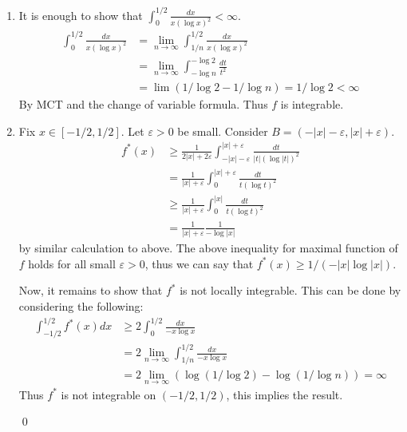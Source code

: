 \begin{problem}[3.5] \hfill

	\begin{enumerate}[label = (\alph*)]
		\item It is enough to show that $\int_0 ^{1/2} \frac{dx}{x(\log x)^2} < \infty$.
			\[
				\begin{split}
					\int_0^{1/2}\frac{dx}{x(\log x)^2}
					& = \lim_{n\rightarrow \infty} \int_{1/n}^{1/2} \frac{dx}{x (\log x )^2} \\
					& = \lim_{n\rightarrow \infty} \int_{-\log n}^{-\log 2} \frac{dt}{t^2} \\
					& = \lim \left( 1/\log 2 - 1/\log n \right) = 1/ \log 2 <\infty
				\end{split}
			\]
			By MCT and the change of variable formula.
			Thus $f$ is integrable.

		\item Fix $x \in \left[ -1/2, 1/2 \right]$. Let $\varepsilon > 0$ be small. Consider $B = \left( -|x| -\varepsilon, |x| +\varepsilon \right)$.
			\[
				\begin{split}
					f^*(x)
					& \geq \frac{1}{2|x|+2\varepsilon} \int_{-|x|-\varepsilon}^{|x|+\varepsilon}\frac{dt}{|t|(\log |t|)^2} \\
					& = \frac{1}{|x| + \varepsilon} \int_0^{|x|+\varepsilon}\frac{dt}{t(\log t)^2}\\
					& \geq \frac{1}{|x|+\varepsilon} \int_0^{|x|} \frac{dt}{t (\log t)^2} \\
					& = \frac{1}{|x|+\varepsilon}\frac{1}{-\log|x|}
				\end{split}
			\]
			by similar calculation to above.
			The above inequality for maximal function of $f$ holds for all small $\varepsilon>0$, thus we can say that $f^*(x) \geq 1/\left( -|x|\log|x| \right)$.

			Now, it remains to show that $f^*$ is not locally integrable.
			This can be done by considering the following:
			\[
				\begin{split}
					\int_{-1/2}^{1/2} f^*(x) dx 
					& \geq 2\int_{0}^{1/2} \frac{dx}{-x\log x} \\
					& = 2 \lim_{n\rightarrow \infty} \int_{1/n}^{1/2}\frac{dx}{-x\log x} \\
					& = 2 \lim_{n\rightarrow \infty} \left( \log\left( 1/\log 2 \right) - \log\left( 1/\log n \right) \right) = \infty
				\end{split}
			\]
			Thus $f^*$ is not integrable on $(-1/2, 1/2)$, this implies the result.

			\qed
	\end{enumerate}

\end{problem}

